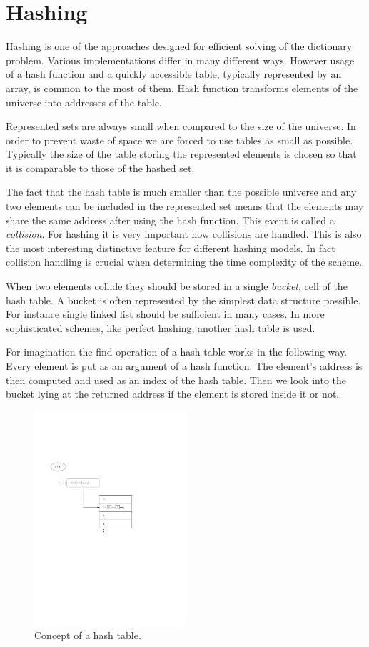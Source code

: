 \chapter{Hashing}
Hashing is one of the approaches designed for efficient solving of the dictionary problem. Various implementations differ in many different ways. However usage of a hash function and a quickly accessible table, typically represented by an array, is common to the most of them. Hash function transforms elements of the universe into addresses of the table.

Represented sets are always small when compared to the size of the universe. In order to prevent waste of space we are forced to use tables as small as possible. Typically the size of the table storing the represented elements is chosen so that it is comparable to those of the hashed set. 

The fact that the hash table is much smaller than the possible universe and any two elements can be included in the represented set means that the elements may share the same address after using the hash function. This event is called a \emph{collision}. For hashing it is very important how collisions are handled. This is also the most interesting distinctive feature for different hashing models. In fact collision handling is crucial when determining the time complexity of the scheme.

When two elements collide they should be stored in a single \emph{bucket}, cell of the hash table. A bucket is often represented by the simplest data structure possible. For instance single linked list should be sufficient in many cases. In more sophisticated schemes, like perfect hashing, another hash table is used. 

For imagination the find operation of a hash table works in the following way. Every element is put as an argument of a hash function. The element's address is then computed and used as an index of the hash table. Then we look into the bucket lying at the returned address if the element is stored inside it or not.

\begin{figure}
  \centering
    \includegraphics[width=0.5\textwidth]{images/hash_table}
  \caption{Concept of a hash table.}
\end{figure}

